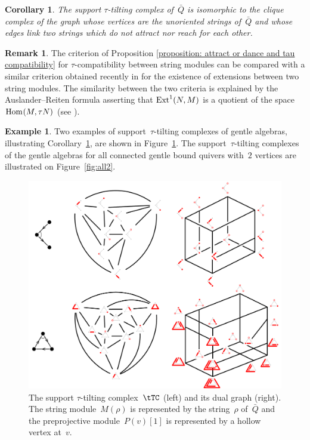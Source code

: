 \documentclass{amsart}
\newtheorem{corollary}[theorem]{Corollary}
\theoremstyle{definition}
\newtheorem{example}[theorem]{Example}
\newtheorem{remark}[theorem]{Remark}
\newcommand{\fref}[1]{Figure~\ref{#1}} %
\newcommand{\Hom}[1]{\operatorname{{\rm Hom}}_{#1}}
\newcommand{\Ext}[1]{\operatorname{{\rm Ext}}_{#1}}
\begin{document}
\begin{corollary}
\label{coro: stautilt complex from strings}
The support $\tau$-tilting complex of~$\bar Q$ is isomorphic to the clique complex of the graph whose vertices are the unoriented strings of~$\bar Q$ and whose edges link two strings which do not attract nor reach for each other.
\end{corollary}

\begin{remark}
The criterion of Proposition \ref{proposition: attract or dance and tau compatibility} for $\tau$-compatibility between string modules can be compared with a similar criterion obtained recently in \cite{CanakciPauksztelloSchroll} for the existence of extensions between two string modules.
The similarity between the two criteria is explained by the Auslander--Reiten formula asserting that $\Ext{}^1(N,M)$ is a quotient of the space $\Hom{}(M,\tau N)$ (see \cite[Thm.~IV.2.13]{AssemSimsonSkowronski}).
\end{remark}


\begin{example}
Two examples of support~$\tau$-tilting complexes of gentle algebras, illustrating Corollary~\ref{coro: stautilt complex from strings}, are shown in Figure~\ref{fig:exmtTC}.
The support~$\tau$-tilting complexes of the gentle algebras for all connected gentle bound quivers with~$2$ vertices are illustrated on \fref{fig:all2}.

\begin{figure}[h]
	\capstart
	\centerline{\includegraphics[scale=.5]{exmtTC}}
	\caption{The support $\tau$-tilting complex~$\tTC$ (left) and its dual graph (right). The string module~$M(\rho)$ is represented by the string~$\rho$ of~$\bar Q$ and the preprojective module~$P(v)[1]$ is represented by a hollow vertex at~$v$.}
	\label{fig:exmtTC}
\end{figure}
\end{example}
\end{document}
